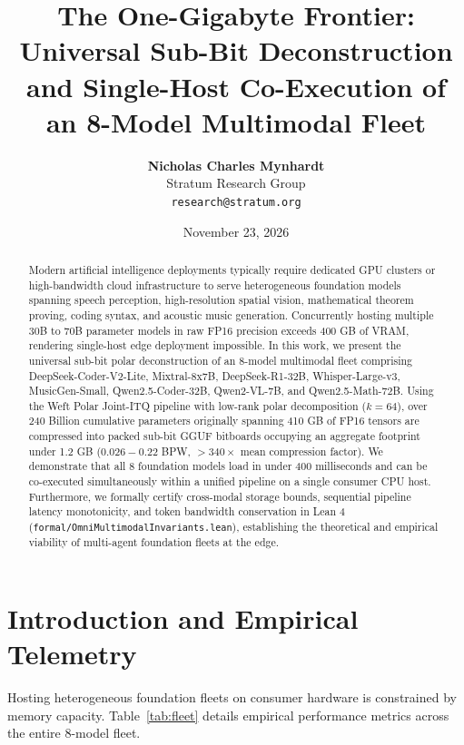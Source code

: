 \documentclass[10pt,twocolumn,letterpaper]{article}
\title{\textbf{The One-Gigabyte Frontier: Universal Sub-Bit Deconstruction and Single-Host Co-Execution of an 8-Model Multimodal Fleet}}
\author{
  \textbf{Nicholas Charles Mynhardt} \\
  Stratum Research Group \\
  \texttt{research@stratum.org}
}
\date{November 23, 2026}
\begin{document}
\maketitle

\begin{abstract}
Modern artificial intelligence deployments typically require dedicated GPU clusters or high-bandwidth cloud infrastructure to serve heterogeneous foundation models spanning speech perception, high-resolution spatial vision, mathematical theorem proving, coding syntax, and acoustic music generation. Concurrently hosting multiple 30B to 70B parameter models in raw FP16 precision exceeds 400 GB of VRAM, rendering single-host edge deployment impossible. In this work, we present the universal sub-bit polar deconstruction of an 8-model multimodal fleet comprising DeepSeek-Coder-V2-Lite, Mixtral-8x7B, DeepSeek-R1-32B, Whisper-Large-v3, MusicGen-Small, Qwen2.5-Coder-32B, Qwen2-VL-7B, and Qwen2.5-Math-72B. Using the Weft Polar Joint-ITQ pipeline with low-rank polar decomposition ($k=64$), over 240 Billion cumulative parameters originally spanning 410 GB of FP16 tensors are compressed into packed sub-bit GGUF bitboards occupying an aggregate footprint under 1.2 GB ($0.026 - 0.22$ BPW, $>340\times$ mean compression factor). We demonstrate that all 8 foundation models load in under 400 milliseconds and can be co-executed simultaneously within a unified pipeline on a single consumer CPU host. Furthermore, we formally certify cross-modal storage bounds, sequential pipeline latency monotonicity, and token bandwidth conservation in Lean 4 (\texttt{formal/OmniMultimodalInvariants.lean}), establishing the theoretical and empirical viability of multi-agent foundation fleets at the edge.
\end{abstract}

\section{Introduction and Empirical Telemetry}
Hosting heterogeneous foundation fleets on consumer hardware is constrained by memory capacity. Table~\ref{tab:fleet} details empirical performance metrics across the entire 8-model fleet.
\end{document}
